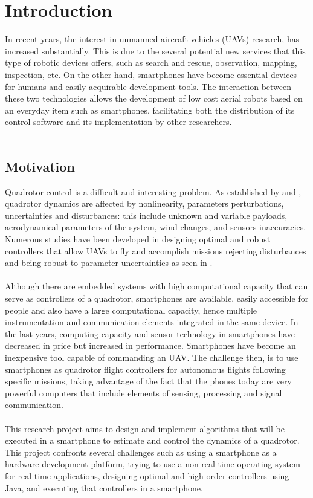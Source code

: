 \chapter{Introduction} \label{ch:introduction}
In recent years, the interest in unmanned aircraft vehicles (UAVs) research, has increased substantially. This is due to the several potential new services that this type of robotic devices offers, such as search and rescue, observation, mapping, inspection, etc. On the other hand, smartphones have become essential devices for humans and easily acquirable development tools. The interaction between these two technologies allows the development of low cost aerial robots based on an everyday item such as smartphones, facilitating both the distribution of its control software and its implementation by other researchers.
\\\\
\section{Motivation}
Quadrotor control is a difficult and interesting problem. As established by \cite{Liu2015} and \cite{Lopez2015}, quadrotor dynamics are affected by nonlinearity, parameters perturbations, uncertainties and disturbances: this include unknown and variable payloads, aerodynamical parameters of the system, wind changes, and sensors inaccuracies. Numerous studies have been developed in designing optimal and robust controllers that allow UAVs to fly and accomplish missions rejecting disturbances and being robust to parameter uncertainties as seen in \cite{Jung2014, Kohno2014, Shang2016, Salazar2014}.\\\\
Although there are embedded systems with high computational capacity that can serve as controllers of a quadrotor, smartphones are available, easily accessible for people and also have a large computational capacity, hence multiple instrumentation and communication elements integrated in the same device. In the last years, computing capacity and sensor technology in smartphones have decreased in price but increased in performance. Smartphones have become an inexpensive tool capable of commanding an UAV. The challenge then, is to use smartphones as quadrotor flight controllers for autonomous flights following specific missions, taking advantage of the fact that the phones today are very powerful computers that include elements of sensing, processing and signal communication.
\\\\
This research project aims to design and implement algorithms that will be executed in a smartphone to estimate and control the dynamics of a quadrotor. This project confronts several challenges such as using a smartphone as a hardware development platform, trying to use a non real-time operating system for real-time applications, designing optimal and high order controllers using Java, and executing that controllers in a smartphone. 
\\\\
